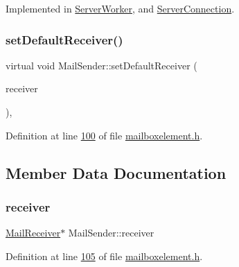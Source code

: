 Implemented in \hyperlink{a00185_a2cfa275ffeff3aeee19058e8155763f5}{Server\+Worker}, and \hyperlink{a00181_afd1dd14f38c6c1d1efa719af1a9d9851}{Server\+Connection}.

\mbox{\label{a00205_aa85db0004c26606c5ac294e5de000b96}} 
\subsubsection{\texorpdfstring{set\+Default\+Receiver()}{setDefaultReceiver()}}
{\footnotesize\ttfamily virtual void Mail\+Sender\+::set\+Default\+Receiver (\begin{DoxyParamCaption}\item[{\hyperlink{a00197}{Mail\+Receiver} $\ast$}]{receiver }\end{DoxyParamCaption})\hspace{0.3cm}{\ttfamily [inline]}, {\ttfamily [virtual]}}



Definition at line \hyperlink{a00002_source_l00100}{100} of file \hyperlink{a00002_source}{mailboxelement.\+h}.



\subsection{Member Data Documentation}
\mbox{\label{a00205_aa57ce2f74f8ad76abb38974f85b97ac5}} 
\subsubsection{\texorpdfstring{receiver}{receiver}}
{\footnotesize\ttfamily \hyperlink{a00197}{Mail\+Receiver}$\ast$ Mail\+Sender\+::receiver\hspace{0.3cm}{\ttfamily [protected]}}



Definition at line \hyperlink{a00002_source_l00105}{105} of file \hyperlink{a00002_source}{mailboxelement.\+h}.

